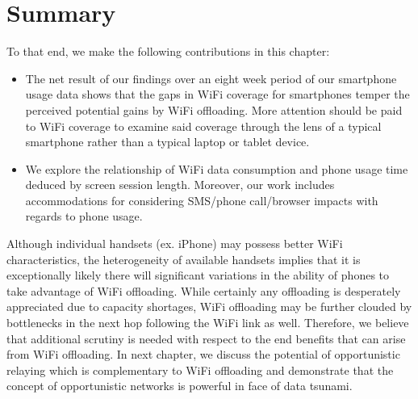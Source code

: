 \section{Summary}
To that end, we make the following contributions in this chapter:
\begin{itemize}
\item The net result of our findings over an eight week period of our smartphone
usage data shows that the gaps in WiFi coverage for smartphones temper the perceived potential gains by 
WiFi offloading. More attention should be paid to WiFi coverage to examine said coverage through the
lens of a typical smartphone rather than a typical laptop or tablet device. 

\item We explore the relationship of WiFi data consumption and phone usage time deduced by screen session length. Moreover,
our work includes accommodations for considering SMS/phone call/browser impacts with regards to phone usage.

\end{itemize}
Although individual handsets (ex. iPhone) may possess better WiFi characteristics, the heterogeneity
of available handsets implies that it is exceptionally likely there will significant variations in the ability of phones to
take advantage of WiFi offloading. While certainly any offloading is desperately appreciated due to capacity
shortages, WiFi offloading may be further clouded by bottlenecks in the next hop following the WiFi link as well. Therefore, we believe that additional scrutiny is needed with respect to the end benefits that can arise from WiFi offloading. In next chapter, we discuss the potential of opportunistic relaying which is complementary to WiFi offloading and demonstrate that the concept of opportunistic networks is powerful in face of data tsunami. 
